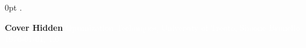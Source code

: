 \documentclass[11pt,fleqn,oneside]{book} %
\newcommand{\AUTHOR}{Simone Brunello}
\newcommand{\DATE}{\today}
\newcommand{\VERSION}{1.0}
\newcommand{\TITLE}{Optimization Techniques}
\newcommand{\SUBTITLE}{University of Trento}
\renewcommand{\coverpage}[5]{{\Huge\textbf{Cover Hidden}}
    \textcolor{white}{#1, #2, #3, #4, #5}}
\begin{document}
    {\topsep}%
    {\topsep}%
    {}%
    {0pt}%
    {\bfseries}%
    {. }%
    { }%
    {\textnormal{}}

    \theoremstyle{theoremdd}


    \newtheorem{definition}{Definition}
    \newtheorem{theorem}{Theorem}

    

    \coverpage{\TITLE}{\SUBTITLE}{\AUTHOR}{\DATE}{\VERSION}

    \newpage

    \pagestyle{fancy}

    
\end{document}
